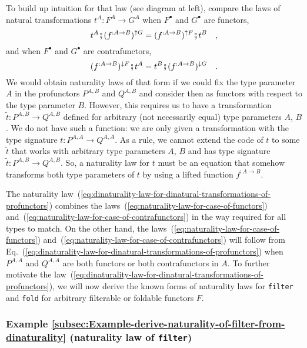 To build up intuition for that law (see diagram at left), compare
the laws of natural transformations $t^{A}:F^{A}\rightarrow G^{A}$
when $F^{\bullet}$ and $G^{\bullet}$ are functors,
\begin{equation}
t^{A}\bef(f^{:A\rightarrow B})^{\uparrow G}=(f^{:A\rightarrow B})^{\uparrow F}\bef t^{B}\quad,\label{eq:naturality-law-for-case-of-functors}
\end{equation}
and when $F^{\bullet}$ and $G^{\bullet}$ are contrafunctors,
\begin{equation}
(f^{:A\rightarrow B})^{\downarrow F}\bef t^{A}=t^{B}\bef(f^{:A\rightarrow B})^{\downarrow G}\quad.\label{eq:naturality-law-for-case-of-contrafunctors}
\end{equation}
We would obtain naturality laws of that form if we could fix the type
parameter $A$ in the profunctors $P^{A,B}$ and $Q^{A,B}$ and consider
then as functors with respect to the type parameter $B$. However,
this requires us to have a transformation $\tilde{t}:P^{A,B}\rightarrow Q^{A,B}$
defined for arbitrary (not necessarily equal) type parameters $A$,
$B$. We do not have such a function: we are only given a transformation
with the type signature $t:P^{A,A}\rightarrow Q^{A,A}$. As a rule,
we cannot extend the code of $t$ to some $\tilde{t}$ that works
with arbitrary type parameters $A$, $B$ and has type signature $\tilde{t}:P^{A,B}\rightarrow Q^{A,B}$.
So, a naturality law for $t$ must be an equation that somehow transforms
both type parameters of $t$ by using a lifted function $f^{:A\rightarrow B}$. 

The naturality law~(\ref{eq:dinaturality-law-for-dinatural-transformations-of-profunctors})
combines the laws~(\ref{eq:naturality-law-for-case-of-functors})
and~(\ref{eq:naturality-law-for-case-of-contrafunctors}) in the
way required for all types to match. On the other hand, the laws~(\ref{eq:naturality-law-for-case-of-functors})
and~(\ref{eq:naturality-law-for-case-of-contrafunctors}) will follow
from Eq.~(\ref{eq:dinaturality-law-for-dinatural-transformations-of-profunctors})
when $P^{A,A}$ and $Q^{A,A}$ are both functors or both contrafunctors
in $A$. To further motivate the law~(\ref{eq:dinaturality-law-for-dinatural-transformations-of-profunctors}),
we will now derive the known forms of naturality laws for \lstinline!filter!
and \lstinline!fold! for arbitrary filterable or foldable functors
$F$.

\subsubsection{Example \label{subsec:Example-derive-naturality-of-filter-from-dinaturality}\ref{subsec:Example-derive-naturality-of-filter-from-dinaturality}
(naturality law of \lstinline!filter!)}

